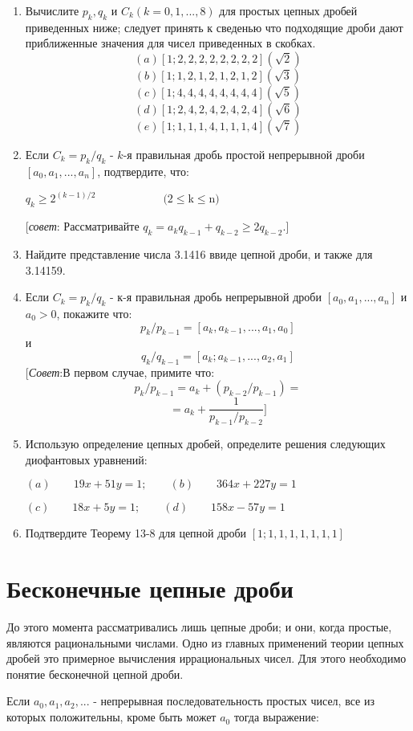 \documentclass[11pt]{article}
\begin{document}
\begin{enumerate}
	\item Вычислите $p_k,q_k$ и $C_k(k=0,1,...,8)$ для простых цепных дробей приведенных ниже; следует принять к сведенью что подходящие дроби дают приближенные значения для чисел приведенных в скобках.
	$$(a) [1;2,2,2,2,2,2,2,2](\sqrt{2})$$
	$$(b) [1;1,2,1,2,1,2,1,2](\sqrt{3})$$
	$$(c) [1;4,4,4,4,4,4,4,4](\sqrt{5})$$
	$$(d) [1;2,4,2,4,2,4,2,4](\sqrt{6})$$
	$$(e) [1;1,1,1,4,1,1,1,4](\sqrt{7})$$
	\item Если $C_k=p_k/q_k$ - $k$-я правильная дробь простой непрерывной дроби $[a_0,a_1,...,a_n]$, подтвердите, что: 
		\begin{center}
	$q_k\ge2^{(k-1)/2}\qquad\qquad\qquad(2\le$k$\le$n$)$
		\end{center}
	[\textit{совет}: Рассматривайте $q_k=a_kq_{k-1}+q_{k-2}\ge2q_{k-2}$.]
	
	\item Найдите представление числа 3.1416 ввиде цепной дроби, и также для 3.14159.
	
	\item Если $C_k=p_k/q_k$ - к-я правильная дробь непрерывной дроби $[a_0,a_1,...,a_n]$ и $a_0>0$, покажите что:
	$$p_k/p_{k-1}=[a_k,a_{k-1},...,a_1,a_0]$$
	и
	$$q_k/q_{k-1}=[a_k;a_{k-1},...,a_2,a_1]$$
	[\textit{Совет}:В первом случае, примите что:
	$$p_k/p_{k-1}=a_k+(p_{k-2}/p_{k-1})=$$
	$$=a_k+\frac{1}{p_{k-1}/p_{k-2}}]$$
	\item Использую определение цепных дробей, определите решения следующих диофантовых уравнений:
	
	$(a)\qquad19x+51y=1;\qquad(b)\qquad364x+227y=1$
	
		$(c)\qquad18x+5y=1;\qquad(d)\qquad158x-57y=1$
		\\
\item Подтвердите Теорему 13-8 для цепной дроби $[1;1,1,1,1,1,1,1]$ 
\end{enumerate}

		
\section{Бесконечные цепные дроби}

До этого момента рассматривались лишь цепные дроби; и они, когда простые, являются рациональными числами. Одно из главных применений теории цепных дробей это примерное вычисления иррациональных чисел. Для этого необходимо понятие бесконечной цепной дроби.
		
Если $a_0,a_1,a_2,...$ - непрерывная последовательность простых чисел, все из которых положительны, кроме быть может $a_0$ тогда выражение: 
		
\end{document}
